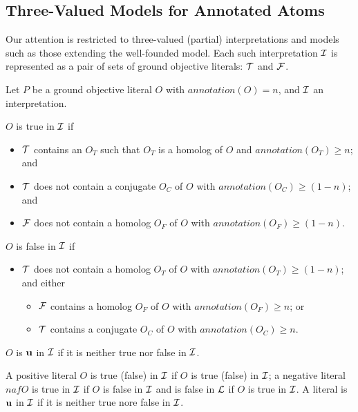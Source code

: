 
\subsection{Three-Valued Models for Annotated Atoms} 

Our attention is restricted to three-valued (partial) interpretations
and models such as those extending the well-founded model.  Each such
interpretation $\cI$ is represented as a pair of sets of ground
objective literals: $\cT$ and $\cF$.


\begin{definition} \label{def:satisfiable}
Let $P$ be a ground objective literal $O$ with
$annotation(O) = n$, and $\cI$ an interpretation.

$O$ is true in $\cI$ if
\begin{itemize}
\item $\cT$ contains an $O_T$ such that $O_T$ is a homolog of
  $O$ and $annotation(O_T) \geq n$; and
\item $\cT$ does not contain a conjugate $O_C$ of $O$ with
  $annotation(O_C) \geq (1-n)$; and
\item $\cF$ does not contain a homolog $O_F$ of $O$ with
  $annotation(O_F) \geq (1-n)$.
\end{itemize}

$O$ is false in $\cI$ if 
\begin{itemize}
\item $\cT$ does not contain a homolog $O_T$ of $O$ with
  $annotation(O_T) \geq (1-n)$; and either
\begin{itemize}  
\item $\cF$ contains a homolog $O_F$ of $O$ with $annotation(O_F) \geq
  n$; or 
\item $\cT$ contains a conjugate $O_C$ of $O$ with $annotation(O_C) \geq n$.
\end{itemize}
\end{itemize}
$O$ is ${\bf u}$ in $\cI$ if it is neither true nor false in $\cI$.

A positive literal $O$ is true (false) in $\cI$ if $O$ is true (false)
in $\cI$; a negative literal $naf O$ is true in $\cI$ if $O$ is false
in $\cI$ and is false in $\cL$ if $O$ is true in $\cI$.  A literal is
${\bf u}$ in $\cI$ if it is neither true nore false in $\cI$.
\end{definition}


